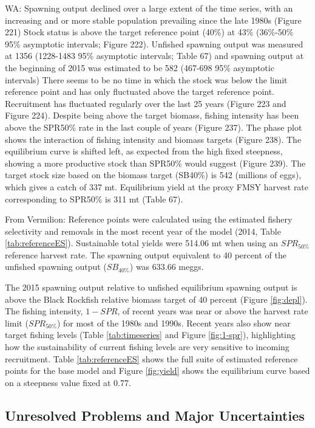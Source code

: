 \documentclass[11pt,
  english,
  letterpaper,
]{article}
\begin{document}
WA: Spawning output declined over a large extent of the time series, with an increasing and or more stable population prevailing since the late 1980s (Figure 221) Stock status is above the target reference point (40\%) at 43\% (36\%-50\% 95\% asymptotic intervals; Figure 222). Unfished spawning output was measured at 1356 (1228-1483 95\% asymptotic intervals; Table 67) and spawning output at the beginning of 2015 was estimated to be 582 (467-698 95\% asymptotic intervals) There seems to be no time in which the stock was below the limit reference point and has only fluctuated above the target reference point. Recruitment has fluctuated regularly over the last 25 years (Figure 223 and Figure 224). Despite being above the target biomass, fishing intensity has been above the SPR50\% rate in the last couple of years (Figure 237). The phase plot shows the interaction of fishing intensity and biomass targets (Figure 238). The equilibrium curve is shifted left, as expected from the high fixed steepness, showing a more productive stock than SPR50\% would suggest (Figure 239). The target stock size based on the biomass target (SB40\%) is 542 (millions of eggs), which gives a catch of 337 mt. Equilibrium yield at the proxy FMSY harvest rate corresponding to SPR50\% is 311 mt (Table 67).

From Vermilion: Reference points were calculated using the estimated fishery selectivity and removals in the most recent year of the model (2014, Table \ref{tab:referenceES}). Sustainable total yields were 514.06 mt when using an \(SPR_{50\%}\) reference harvest rate. The spawning output equivalent to 40 percent of the unfished spawning output (\(SB_{40\%}\)) was 633.66 meggs.

The 2015 spawning output relative to unfished equilibrium spawning output is above the Black Rockfish relative biomass target of 40 percent (Figure \ref{fig:depl}). The fishing intensity, \(1-SPR\), of recent years was near or above the harvest rate limit (\(SPR_{50\%}\)) for most of the 1980s and 1990s. Recent years also show near target fishing levels (Table \ref{tab:timeseries} and Figure \ref{fig:1-spr}), highlighting how the sustainability of current fishing levels are very sensitive to incoming recruitment. Table \ref{tab:referenceES} shows the full suite of estimated reference points for the base model and Figure \ref{fig:yield} shows the equilibrium curve based on a steepness value fixed at 0.77.

\hypertarget{unresolved-problems-and-major-uncertainties-2}{%
\subsection{Unresolved Problems and Major Uncertainties}\label{unresolved-problems-and-major-uncertainties-2}}
\end{document}
